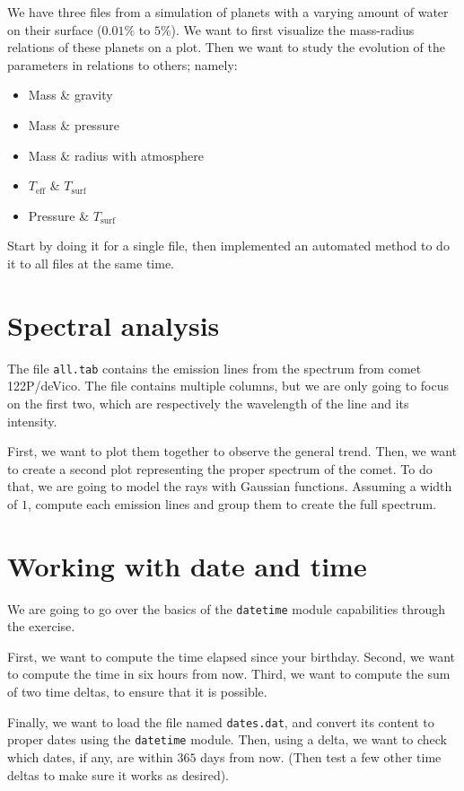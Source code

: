 \documentclass[twocolumn]{article}
\begin{document}
We have three files from a simulation of planets with a varying amount of water on their surface ($0.01\%$ to $5\%$). We want to first visualize the mass-radius relations of these planets on a plot. Then we want to study the evolution of the parameters in relations to others; namely:

\begin{itemize}
    \item Mass \& gravity
    \item Mass \& pressure
    \item Mass \& radius with atmosphere
    \item $T_{\mathrm{eff}}$ \& $T_{\mathrm{surf}}$
    \item Pressure \& $T_{\mathrm{surf}}$
\end{itemize}

Start by doing it for a single file, then implemented an automated method to do it to all files at the same time.

\section{Spectral analysis}\label{sec:spectral_analysis}

The file \verb|all.tab| contains the emission lines from the spectrum from comet 122P/deVico. The file contains multiple columns, but we are only going to focus on the first two, which are respectively the wavelength of the line and its intensity.

First, we want to plot them together to observe the general trend. Then, we want to create a second plot representing the proper spectrum of the comet. To do that, we are going to model the rays with Gaussian functions. Assuming a width of $1$, compute each emission lines and group them to create the full spectrum.

\section{Working with date and time}\label{sec:datetime}

We are going to go over the basics of the \verb|datetime| module capabilities through the exercise.

First, we want to compute the time elapsed since your birthday. Second, we want to compute the time in six hours from now. Third, we want to compute the sum of two time deltas, to ensure that it is possible.

Finally, we want to load the file named \verb|dates.dat|, and convert its content to proper dates using the \verb|datetime| module. Then, using a delta, we want to check which dates, if any, are within $365$ days from now. (Then test a few other time deltas to make sure it works as desired).
\end{document}
